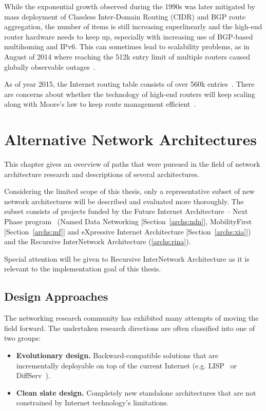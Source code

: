         While the exponential growth observed during the 1990s was later mitigated by mass deployment of Classless Inter-Domain Routing (CIDR) and BGP route aggregation, the number of items is still increasing superlinearly and the high-end router hardware needs to keep up, especially with increasing use of BGP-based multihoming and IPv6. This can sometimes lead to scalability problems, as in August of 2014 where reaching the 512k entry limit of multiple routers caused globally observable outages~\cite{512k_day}.

        As of year 2015, the Internet routing table consists of over 560k entries~\cite{bgpgrow}. There are concerns about whether the technology of high-end routers will keep scaling along with Moore's law to keep route management efficient~\cite{rfc4984}.


\chapter{Alternative Network Architectures}\label{archs}

    This chapter gives an overview of paths that were pursued in the field of network architecture research and descriptions of several architectures.

    Considering the limited scope of this thesis, only a representative subset of new network architectures will be described and evaluated more thoroughly. The subset consists of projects funded by the Future Internet Architecture -- Next Phase program~\cite{fia} (Named Data Networking [Section~\ref{archs:ndn}], MobilityFirst [Section~\ref{archs:mf}] and eXpressive Internet Architecture [Section~\ref{archs:xia}]) and the Recursive InterNetwork Architecture (\ref{archs:rina}).

    Special attention will be given to Recursive InterNetwork Architecture as it is relevant to the implementation goal of this thesis.

    \section{Design Approaches}

        The networking research community has exhibited many attempts of moving the field forward. The undertaken research directions are often classified into one of two groups:

        \begin{itemize}
            \item \textbf{Evolutionary design.} Backward-compatible solutions that are incrementally deployable on top of the current Internet (e.g. LISP~\cite{rfc6830} or DiffServ~\cite{rfc2474}).
            \item \textbf{Clean slate design.} Completely new standalone architectures that are not constrained by Internet technology's limitations.
        \end{itemize}

